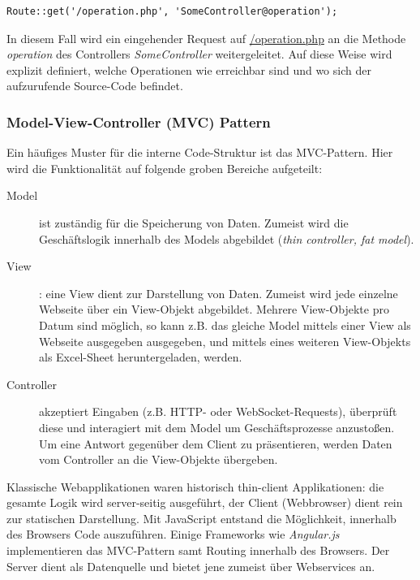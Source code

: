 \begin{verbatim}
Route::get('/operation.php', 'SomeController@operation');
\end{verbatim}

In diesem Fall wird ein eingehender Request auf \url{/operation.php} an die Methode \textit{operation} des Controllers \textit{SomeController} weitergeleitet. Auf diese Weise wird explizit definiert, welche Operationen wie erreichbar sind und wo sich der aufzurufende Source-Code befindet.

\subsubsection{Model-View-Controller (MVC) Pattern}

Ein häufiges Muster für die interne Code-Struktur ist das MVC-Pattern. Hier wird die Funktionalität auf folgende groben Bereiche aufgeteilt:

\begin{description}
	\item[Model] ist zuständig für die Speicherung von Daten. Zumeist wird die Geschäftslogik innerhalb des Models abgebildet (\textit{thin controller, fat model}).
	\item[View]: eine View dient zur Darstellung von Daten. Zumeist wird jede einzelne Webseite über ein View-Objekt abgebildet. Mehrere View-Objekte pro Datum sind möglich, so kann z.B. das gleiche Model mittels einer View als Webseite ausgegeben ausgegeben, und mittels eines weiteren View-Objekts als Excel-Sheet heruntergeladen, werden.
	\item[Controller] akzeptiert Eingaben (z.B. HTTP- oder WebSocket-Requests), überprüft diese und interagiert mit dem Model um Geschäftsprozesse anzustoßen. Um eine Antwort gegenüber dem Client zu präsentieren, werden Daten vom Controller an die View-Objekte übergeben.
\end{description}

Klassische Webapplikationen waren historisch thin-client Applikationen: die gesamte Logik wird server-seitig ausgeführt, der Client (Webbrowser) dient rein zur statischen Darstellung. Mit JavaScript entstand die Möglichkeit, innerhalb des Browsers Code auszuführen. Einige Frameworks wie \textit{Angular.js} implementieren das MVC-Pattern samt Routing innerhalb des Browsers. Der Server dient als Datenquelle und bietet jene zumeist über Webservices an.

